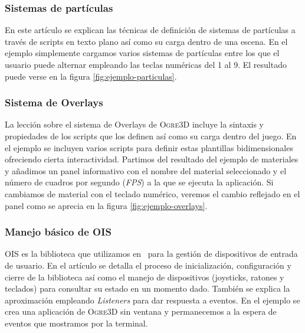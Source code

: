 
\subsubsection{Sistemas de partículas}

En este artículo se explican las técnicas de definición de sistemas de partículas
a través de scripts en texto plano así como su carga dentro de una escena.
En el ejemplo simplemente cargamos varios sistemas de partículas entre
los que el usuario puede alternar empleando las teclas numéricas del 1 al
9. El resultado puede verse en la figura \ref{fig:ejemplo-particulas}.\\


\subsubsection{Sistema de Overlays}

La lección sobre el sistema de Overlays de \textsc{Ogre3D} incluye la sintaxis
y propiedades de los scripts que los definen así como su carga dentro del juego.
En el ejemplo se incluyen varios scripts para definir estas plantillas bidimensionales
ofreciendo cierta interactividad. Partimos del resultado del ejemplo de materiales
y añadimos un panel informativo con el nombre del material seleccionado
y el número de cuadros por segundo (\textit{FPS}) a la que se ejecuta
la aplicación. Si cambiamos de material con el teclado numérico, veremos
el cambio reflejado en el panel como se aprecia en la figura \ref{fig:ejemplo-overlays}.\\


\subsubsection{Manejo básico de OIS}

\textsc{OIS} es la biblioteca que utilizamos en \wiki\ para la gestión
de dispositivos de entrada de usuario. En el artículo se detalla el proceso
de inicialización, configuración y cierre de la biblioteca así como el manejo
de dispositivos (joysticks, ratones y teclados) para consultar su estado
en un momento dado. También se explica la aproximación empleando \textit{Listeners}
\cite{gamm77} para dar respuesta a eventos. En el ejemplo se crea una aplicación
de \textsc{Ogre3D} sin ventana y permanecemos a la espera de eventos que
mostramos por la terminal.\\

